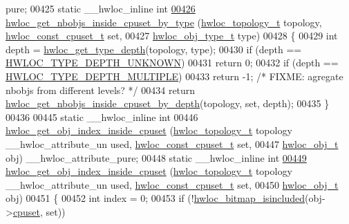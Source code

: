 \begin{DoxyCode}
{{      pure;
00425 \textcolor{keyword}{static} \_\_hwloc\_inline \textcolor{keywordtype}{int}
\hypertarget{a00031_source_l00426}{}\hyperlink{a00054_ga63481874c69ed257b1a0c03e7615ff97}{00426} \hyperlink{a00054_ga63481874c69ed257b1a0c03e7615ff97}{hwloc_get_nbobjs_inside_cpuset_by_type} (\hyperlink{a00039_ga9d1e76ee15a7dee158b786c30b6a6e38}{hwloc_topology_t} topology, 
      \hyperlink{a00040_ga1f784433e9b606261f62d1134f6a3b25}{hwloc_const_cpuset_t} \textcolor{keyword}{set},
00427                                         \hyperlink{a00041_gacd37bb612667dc437d66bfb175a8dc55}{hwloc_obj_type_t} type)
00428 \{
00429   \textcolor{keywordtype}{int} depth = \hyperlink{a00046_gaea7c64dd59467f5201ba87712710b14d}{hwloc_get_type_depth}(topology, type);
00430   \textcolor{keywordflow}{if} (depth == \hyperlink{a00046_ggaf4e663cf42bbe20756b849c6293ef575a0565ab92ab72cb0cec91e23003294aad}{HWLOC_TYPE_DEPTH_UNKNOWN})
00431     \textcolor{keywordflow}{return} 0;
00432   \textcolor{keywordflow}{if} (depth == \hyperlink{a00046_ggaf4e663cf42bbe20756b849c6293ef575ae99465995cacde6c210d5fc2e409798c}{HWLOC_TYPE_DEPTH_MULTIPLE})
00433     \textcolor{keywordflow}{return} -1; \textcolor{comment}{/* FIXME: agregate nbobjs from different levels? */}
00434   \textcolor{keywordflow}{return} \hyperlink{a00054_ga457604a2dedbf70ba3b480558666b56b}{hwloc_get_nbobjs_inside_cpuset_by_depth}(topology, \textcolor{keyword}{set}, depth);
00435 \}
00436 
00445 \textcolor{keyword}{static} \_\_hwloc\_inline \textcolor{keywordtype}{int}
00446 \hyperlink{a00054_ga7cdb6a4645e9b1ec80137e72d1736fdd}{hwloc_get_obj_index_inside_cpuset} (\hyperlink{a00039_ga9d1e76ee15a7dee158b786c30b6a6e38}{hwloc_topology_t} topology \_\_hwloc\_attribute\_un
      used, \hyperlink{a00040_ga1f784433e9b606261f62d1134f6a3b25}{hwloc_const_cpuset_t} \textcolor{keyword}{set},
00447                                    \hyperlink{a00016}{hwloc_obj_t} obj) \_\_hwloc\_attribute\_pure;
00448 \textcolor{keyword}{static} \_\_hwloc\_inline \textcolor{keywordtype}{int}
\hypertarget{a00031_source_l00449}{}\hyperlink{a00054_ga7cdb6a4645e9b1ec80137e72d1736fdd}{00449} \hyperlink{a00054_ga7cdb6a4645e9b1ec80137e72d1736fdd}{hwloc_get_obj_index_inside_cpuset} (\hyperlink{a00039_ga9d1e76ee15a7dee158b786c30b6a6e38}{hwloc_topology_t} topology \_\_hwloc\_attribute\_un
      used, \hyperlink{a00040_ga1f784433e9b606261f62d1134f6a3b25}{hwloc_const_cpuset_t} \textcolor{keyword}{set},
00450                                    \hyperlink{a00016}{hwloc_obj_t} obj)
00451 \{
00452   \textcolor{keywordtype}{int} index = 0;
00453   \textcolor{keywordflow}{if} (!\hyperlink{a00065_gaae29e14a926c198e8f91e6e4790621e7}{hwloc_bitmap_isincluded}(obj->\hyperlink{a00016_a67925e0f2c47f50408fbdb9bddd0790f}{cpuset}, \textcolor{keyword}{set}))
}}
\end{DoxyCode}
